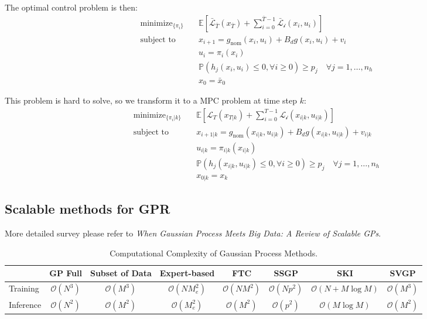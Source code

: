 \documentclass[10pt]{elegantbook}
\begin{document}
The optimal control problem is then:
\begin{align}
    \text{minimize}_{\{\pi_i\}} \quad & \mathbb{E} \left[ \bar{\mathcal{L}}_{\bar T}(x_{\bar T}) + \sum_{i=0}^{\bar T-1} \mathcal{\bar L_i}(x_i, u_i) \right] \\
    \text{subject to} \quad & x_{i+1} = g_{\text{nom}}(x_i, u_i) + B_d g(x_i, u_i) + v_i \\
    & u_i = \pi_i(x_i) \\
    & \mathbb{P}(h_j(x_i, u_i) \leq 0, \forall i \geq 0) \geq p_j \quad \forall j=1,\ldots,n_h \\
    & x_0 = \bar{x}_0
\end{align}

This problem is hard to solve, so we transform it to a MPC problem at time step $k$:
\begin{align}
    \text{minimize}_{\{\pi_i | k\}} \quad & \mathbb{E} \left[ \mathcal{L}_{T}(x_{T|k}) + \sum_{i=0}^{T-1} \mathcal{L_i}(x_{i|k}, u_{i|k}) \right] \\
    \text{subject to} \quad & x_{i+1|k} = g_{\text{nom}}(x_{i|k}, u_{i|k}) + B_d g(x_{i|k}, u_{i|k}) + v_{i|k} \\
    & u_{i|k} = \pi_{i|k}(x_{i|k}) \\
    & \mathbb{P}(h_j(x_{i|k}, u_{i|k}) \leq 0, \forall i \geq 0) \geq p_j \quad \forall j=1,\ldots,n_h \\
    & x_{0|k} = x_k
\end{align}

\subsection{Scalable methods for GPR}
More detailed survey please refer to \textit{When Gaussian Process Meets Big Data: A Review of Scalable GPs}.

\begin{table}[ht]
\centering
\caption{Computational Complexity of Gaussian Process Methods.}
\begin{tabular}{lccccccc}
\toprule
& GP Full & Subset of Data & Expert-based & FTC & SSGP & SKI & SVGP \\
\midrule
Training  & $\mathcal O(N^3)$ & $\mathcal O(M^3)$ & $\mathcal O(NM_e^2)$ & $\mathcal O(NM^2)$ & $\mathcal O(Np^2)$ & $\mathcal O(N + M \log M)$ & $\mathcal O(M^3)$ \\
Inference & $\mathcal O(N^2)$ & $\mathcal O(M^2)$ & $\mathcal O(M_e^2)$  & $\mathcal O(M^2)$  & $\mathcal O(p^2)$  & $\mathcal O(M \log M)$     & $\mathcal O(M^2)$ \\
\bottomrule
\end{tabular}
\end{table}
\end{document}
